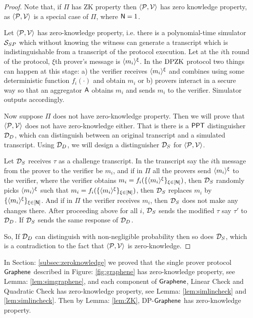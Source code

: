 \begin{proof}
	Note that, if $\Pi$ has ZK property then $\langle \mathcal{P},\mathcal{V}\rangle$ has zero knowledge property, as $\langle \mathcal{P},\mathcal{V}\rangle$ is a special case of $\Pi$, where $\mathsf{N}=1$. 
	
	Let $\langle \mathcal{P},\mathcal{V}\rangle$ has zero-knowledge property, i.e. there is a polynomial-time simulator $\mathcal{S}_{SP}$ which without knowing the witness can generate a transcript which is indistinguishable from a transcript of the protocol execution. 
	Let at the $i$th round of the protocol, $\xi$th prover's message is $\langle{m_i}\rangle^\xi$. In the $\text{DPZK}$ protocol two things can happen at this stage: a) the verifier receives $\langle{m_i}\rangle^\xi$ and combines using some deterministic function $f_i(\cdot)$ and obtain $m_i$ or b) provers interact in a secure way so that an aggregator $\mathsf{A}$ obtains $m_i$ and sends $m_i$ to the verifier.
	Simulator outputs accordingly. 
	
	Now suppose $\Pi$ does not have zero-knowledge property. Then we will prove that $\langle \mathcal{P},\mathcal{V}\rangle$ does not have zero-knowledge either. That is there is a $\mathsf{PPT}$ distinguisher $\mathcal{D}_{D}$, which can distinguish between an original transcript and a simulated transcript. Using $\mathcal{D}_{D}$, we will design a distinguisher $\mathcal{D}_{S}$ for $\langle \mathcal{P},\mathcal{V}\rangle$.
	
	Let $\mathcal{D}_{S}$ receives $\tau$ as a challenge transcript. In the transcript say the $i$th message from the prover to the verifier be $m_i$, and if in $\Pi$ all the provers send $\langle{m_i}\rangle^\xi$ to the verifier, where the verifier obtains $m_i=f_i(\{\langle{m_i}\rangle^\xi\}_{\xi\in[\mathsf{N}]})$, then $\mathcal{D}_{S}$ randomly picks $\langle{m_i}\rangle^\xi$ such that $m_i=f_i(\{\langle{m_i}\rangle^\xi\}_{\xi\in[\mathsf{N}]})$, then $\mathcal{D}_{S}$ replaces $m_i$ by $\{\langle{m_i}\rangle^\xi\}_{\xi\in[\mathsf{N}]}$. And if in $\Pi$ the verifier receives $m_i$, then $\mathcal{D}_{S}$ does not make any changes there. 
	After proceeding above for all $i$, $\mathcal{D}_{S}$ sends the modified $\tau$ say $\tau'$ to $\mathcal{D}_{D}$. If $\mathcal{D}_{S}$ sends the same response of $\mathcal{D}_{D}$.
	
	So, If $\mathcal{D}_{D}$ can distinguish with non-negligible probability then so does $\mathcal{D}_{S}$, which is a contradiction to the fact that $\langle \mathcal{P},\mathcal{V}\rangle$ is zero-knowledge.
\end{proof}

In Section: \ref{subsec:zeroknowledge} we proved that the single prover protocol $\textsf{Graphene}$ described in Figure: \ref{fig:graphene} has zero-knowledge property, see Lemma: \ref{lem:simgraphene}, and each component of $\textsf{Graphene}$, Linear Check and Quadratic Check has zero-knowledge property, see Lemma: \ref{lem:simlincheck} and \ref{lem:simlincheck}. Then by Lemma: \ref{lem:ZK}, DP-$\textsf{Graphene}$ has zero-knowledge property.

